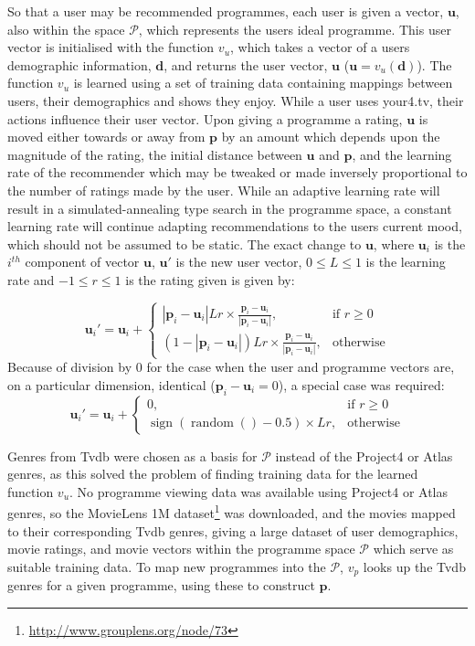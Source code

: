 So that a user may be recommended programmes, each user is given a vector, $\mathbf{u}$, also within the space $\mathcal{P}$, which represents the users ideal programme. This user vector is initialised with the function $v_u$, which takes a vector of a users demographic information, $\mathbf{d}$, and returns the user vector, $\mathbf{u}$ ($\mathbf{u} = v_u(\mathbf{d})$). The function $v_u$ is learned using a set of training data containing mappings between users, their demographics and shows they enjoy. While a user uses your4.tv, their actions influence their user vector. Upon giving a programme a rating, $\mathbf{u}$ is moved either towards or away from $\mathbf{p}$ by an amount which depends upon the magnitude of the rating, the initial distance between $\mathbf{u}$ and $\mathbf{p}$, and the learning rate of the recommender which may be tweaked or made inversely proportional to the number of ratings made by the user. While an adaptive learning rate will result in a simulated-annealing type search in the programme space, a constant learning rate will continue adapting recommendations to the users current mood, which should not be assumed to be static. The exact change to $\mathbf{u}$, where $\mathbf{u}_{i}$ is the $i^{th}$ component of vector $\mathbf{u}$, $\mathbf{u}'$ is the new user vector, $0 \leq L \leq 1$ is the learning rate and $-1 \leq r \leq 1$ is the rating given is given by:

$$
	\mathbf{u}_{i}' =
	\mathbf{u}_{i} + \begin{cases}
		\left|\mathbf{p}_{i}-\mathbf{u}_{i}\right|Lr \times \frac{\mathbf{p}_{i}-\mathbf{u}_{i}}{\left|\mathbf{p}_{i}-\mathbf{u}_{i}\right|},&
			\text{if } r\geq 0\\
		(1-\left|\mathbf{p}_{i}-\mathbf{u}_{i}\right|)Lr \times \frac{\mathbf{p}_{i}-\mathbf{u}_{i}}{\left|\mathbf{p}_{i}-\mathbf{u}_{i}\right|},&
			\text{otherwise}
	\end{cases}
$$
Because of division by 0 for the case when the user and programme vectors are, on a particular dimension, identical ($\mathbf{p}_{i}-\mathbf{u}_{i}=0$), a special case was required:
$$
	\mathbf{u}_{i}' =
	\mathbf{u}_{i} + \begin{cases}
		0,&
			\text{if } r\geq 0\\
		\operatorname{sign}(\operatorname{random}()-0.5)\times Lr,&
			\text{otherwise}
	\end{cases}
$$

Genres from Tvdb were chosen as a basis for $\mathcal{P}$ instead of the Project4 or Atlas genres, as this solved the problem of finding training data for the learned function $v_u$. No programme viewing data was available using Project4 or Atlas genres, so the MovieLens 1M dataset\footnote{\url{http://www.grouplens.org/node/73}} was downloaded, and the movies mapped to their corresponding Tvdb genres, giving a large dataset of user demographics, movie ratings, and movie vectors within the programme space $\mathcal{P}$ which serve as suitable training data. To map new programmes into the $\mathcal{P}$, $v_p$ looks up the Tvdb genres for a given programme, using these to construct $\mathbf{p}$.

